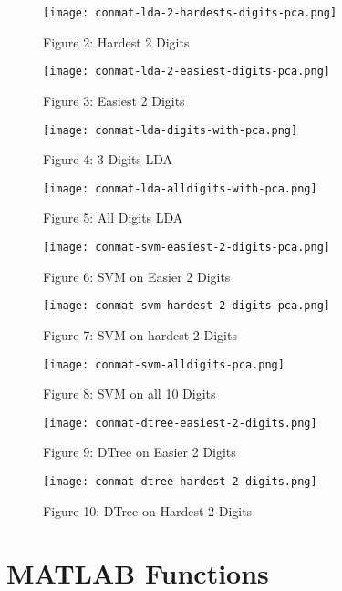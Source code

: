 \documentclass{article}
\begin{document}
\begin{appendices}

    \begin{figure}[h]
        \hspace{0em}
        \texttt{[image: conmat-lda-2-hardests-digits-pca.png]}
        \caption{Figure 2: Hardest 2 Digits}\label{fig:figure2}
        \hspace{0em}
        \texttt{[image: conmat-lda-2-easiest-digits-pca.png]}
        \caption{Figure 3: Easiest 2 Digits} \label{fig:figure3}
        \hspace{0em}
        \texttt{[image: conmat-lda-digits-with-pca.png]}
        \caption{Figure 4: 3 Digits LDA}\label{fig:figure4}
        \hspace{0em}
        \texttt{[image: conmat-lda-alldigits-with-pca.png]}
        \caption{Figure 5: All Digits LDA}\label{fig:figure5}
        \label{fig:fig2}
    \end{figure}
    \begin{figure}[h]
        \texttt{[image: conmat-svm-easiest-2-digits-pca.png]}
        \caption{Figure 6: SVM on Easier 2 Digits}\label{fig:figure6}
        \texttt{[image: conmat-svm-hardest-2-digits-pca.png]}
        \caption{Figure 7: SVM on hardest 2 Digits} \label{fig:figure7}
        \texttt{[image: conmat-svm-alldigits-pca.png]}
        \caption{Figure 8: SVM on all 10 Digits}\label{fig:figure8}
        \label{fig:fig3}
    \end{figure}
    \begin{figure}[h]
        \texttt{[image: conmat-dtree-easiest-2-digits.png]}
        \caption{Figure 9: DTree on Easier 2 Digits}\label{fig:figure9}
        \texttt{[image: conmat-dtree-hardest-2-digits.png]}
        \caption{Figure 10: DTree on Hardest 2 Digits}\label{fig:figure10}
        \label{}
    \end{figure}

\section{MATLAB Functions}

\end{appendices}
\end{document}
